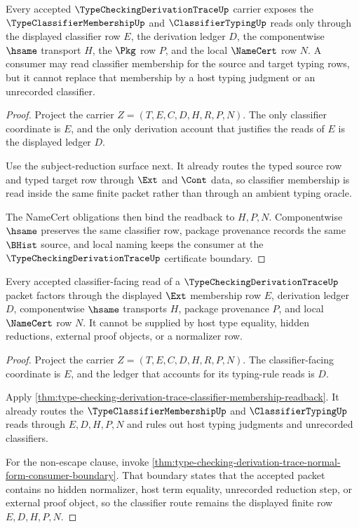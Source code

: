 \begin{theorem}
\label{thm:type-checking-derivation-trace-classifier-membership-readback}
Every accepted $\TypeCheckingDerivationTraceUp$ carrier exposes the $\TypeClassifierMembershipUp$ and $\ClassifierTypingUp$ reads only through the displayed classifier row $E$, the derivation ledger $D$, the componentwise $\hsame$ transport $H$, the $\Pkg$ row $P$, and the local $\NameCert$ row $N$. A consumer may read classifier membership for the source and target typing rows, but it cannot replace that membership by a host typing judgment or an unrecorded classifier.
\end{theorem}
\begin{proof}
Project the carrier $Z=(T,E,C,D,H,R,P,N)$. The only classifier coordinate is $E$, and the only derivation account that justifies the reads of $E$ is the displayed ledger $D$.

Use the subject-reduction surface next. It already routes the typed source row and typed target row through $\Ext$ and $\Cont$ data, so classifier membership is read inside the same finite packet rather than through an ambient typing oracle.

The NameCert obligations then bind the readback to $H,P,N$. Componentwise $\hsame$ preserves the same classifier row, package provenance records the same $\BHist$ source, and local naming keeps the consumer at the $\TypeCheckingDerivationTraceUp$ certificate boundary.
\end{proof}

\begin{theorem}
\label{thm:type-checking-derivation-trace-classifier-route}
Every accepted classifier-facing read of a $\TypeCheckingDerivationTraceUp$ packet factors through the displayed $\Ext$ membership row $E$, derivation ledger $D$, componentwise $\hsame$ transports $H$, package provenance $P$, and local $\NameCert$ row $N$. It cannot be supplied by host type equality, hidden reductions, external proof objects, or a normalizer row.
\end{theorem}
\begin{proof}
Project the carrier $Z=(T,E,C,D,H,R,P,N)$. The classifier-facing coordinate is $E$, and the ledger that accounts for its typing-rule reads is $D$.

Apply \autoref{thm:type-checking-derivation-trace-classifier-membership-readback}. It already routes the $\TypeClassifierMembershipUp$ and $\ClassifierTypingUp$ reads through $E,D,H,P,N$ and rules out host typing judgments and unrecorded classifiers.

For the non-escape clause, invoke \autoref{thm:type-checking-derivation-trace-normal-form-consumer-boundary}. That boundary states that the accepted packet contains no hidden normalizer, host term equality, unrecorded reduction step, or external proof object, so the classifier route remains the displayed finite row $E,D,H,P,N$.
\end{proof}


